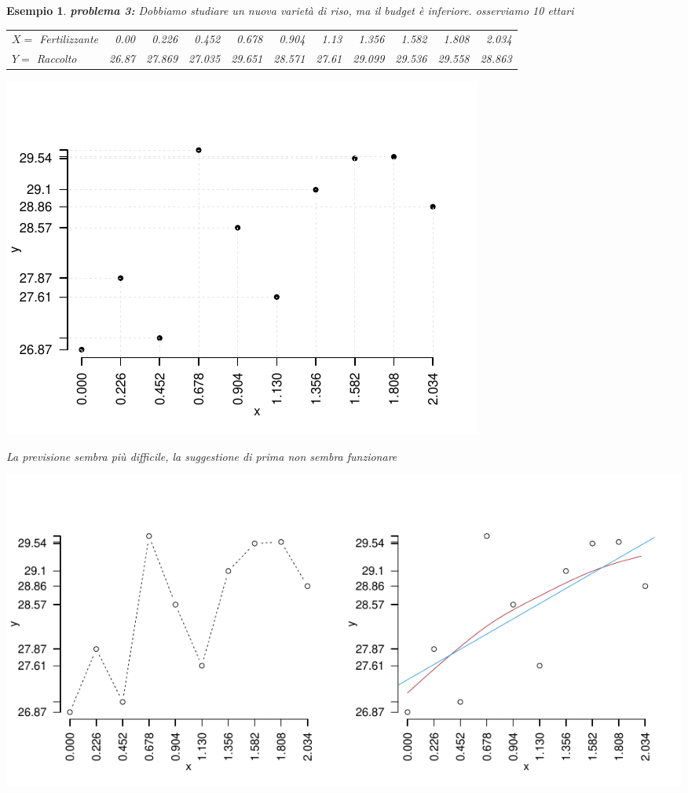 \documentclass[
  11pt,
]{book}
\theoremstyle{mytheoremstyle}
\theoremstyle{mydefstyle}
\newtheorem{example}{{Esempio}}[section]
\begin{document}
\begin{example}

\textbf{problema 3:} Dobbiamo studiare un nuova varietà di riso, ma il budget è inferiore.
osserviamo 10 ettari

\begin{tabular}{lrrrrrrrrrr}
\toprule
$X=$ Fertilizzante & 0.00 & 0.226 & 0.452 & 0.678 & 0.904 & 1.13 & 1.356 & 1.582 & 1.808 & 2.034\\
$Y=$ Raccolto & 26.87 & 27.869 & 27.035 & 29.651 & 28.571 & 27.61 & 29.099 & 29.536 & 29.558 & 28.863\\
\bottomrule
\end{tabular}

\begin{center}\includegraphics{Appunti_di_Statistica_2025_files/figure-latex/17-regressione-I-15-1} \end{center}

La previsione sembra più difficile,
la suggestione di prima non sembra funzionare

\begin{center}\includegraphics{Appunti_di_Statistica_2025_files/figure-latex/17-regressione-I-2,-1} \end{center}

\end{example}
\end{document}
